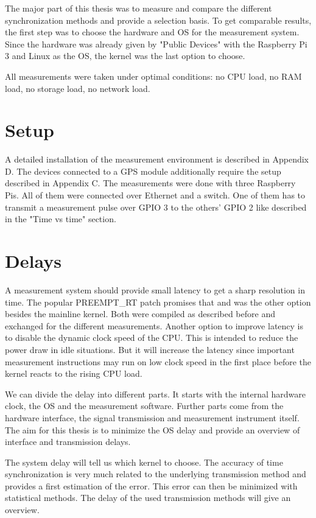 The major part of this thesis was to measure and compare the different synchronization methods and provide a selection basis. To get comparable results, the first step was to choose the hardware and OS for the measurement system. Since the hardware was already given by "Public Devices" with the Raspberry Pi 3 and Linux as the OS, the kernel was the last option to choose.

All measurements were taken under optimal conditions: no CPU load, no RAM load, no storage load, no network load.

\section{Setup}

A detailed installation of the measurement environment is described in Appendix D. The devices connected to a GPS module additionally require the setup described in Appendix C.
The measurements were done with three Raspberry Pis. All of them were connected over Ethernet and a switch. One of them has to transmit a measurement pulse over GPIO 3 to the others' GPIO 2 like described in the "Time vs time" section.

\section{Delays}

A measurement system should provide small latency to get a sharp resolution in time. The popular PREEMPT\_RT patch promises that and was the other option besides the mainline kernel. Both were compiled as described before and exchanged for the different measurements.
Another option to improve latency is to disable the dynamic clock speed of the CPU. This is intended to reduce the power draw in idle situations. But it will increase the latency since important measurement instructions may run on low clock speed in the first place before the kernel reacts to the rising CPU load.

We can divide the delay into different parts. It starts with the internal hardware clock, the OS and the measurement software. Further parts come from the hardware interface, the signal transmission and measurement instrument itself. The aim for this thesis is to minimize the OS delay and provide an overview of interface and transmission delays.

The system delay will tell us which kernel to choose. The accuracy of time synchronization is very much related to the underlying transmission method and provides a first estimation of the error. This error can then be minimized with statistical methods. The delay of the used transmission methods will give an overview.

